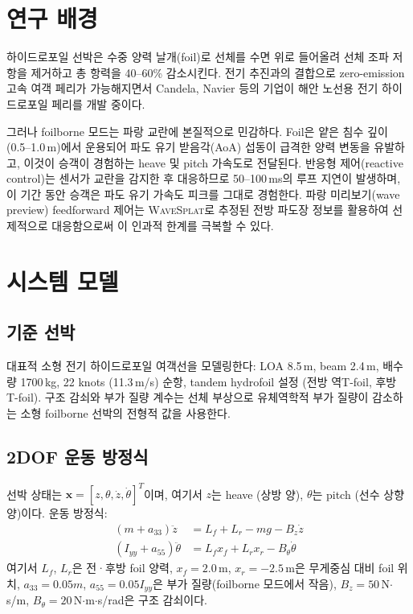 \documentclass[11pt]{report}
\numberwithin{equation}{chapter}
\numberwithin{figure}{chapter}
\numberwithin{table}{chapter}
\newcommand{\WS}{\textsc{WaveSplat}}
\begin{document}
\section{연구 배경}
\label{sec:hydrofoil_bg}

하이드로포일 선박은 수중 양력 날개(foil)로 선체를 수면 위로 들어올려
선체 조파 저항을 제거하고 총 항력을 40--60\% 감소시킨다.
전기 추진과의 결합으로 zero-emission 고속 여객 페리가 가능해지면서
Candela, Navier 등의 기업이 해안 노선용 전기 하이드로포일 페리를 개발 중이다.

그러나 foilborne 모드는 파랑 교란에 본질적으로 민감하다.
Foil은 얕은 침수 깊이(0.5--1.0\,m)에서 운용되어 파도 유기 받음각(AoA) 섭동이
급격한 양력 변동을 유발하고, 이것이 승객이 경험하는 heave 및 pitch 가속도로
전달된다.
반응형 제어(reactive control)는 센서가 교란을 감지한 후 대응하므로
50--100\,ms의 루프 지연이 발생하며, 이 기간 동안 승객은 파도 유기 가속도 피크를
그대로 경험한다.
파랑 미리보기(wave preview) feedforward 제어는
\WS{}로 추정된 전방 파도장 정보를 활용하여 선제적으로 대응함으로써
이 인과적 한계를 극복할 수 있다.

\section{시스템 모델}
\label{sec:hydrofoil_model}

\subsection{기준 선박}

대표적 소형 전기 하이드로포일 여객선을 모델링한다:
LOA 8.5\,m, beam 2.4\,m, 배수량 1700\,kg,
22 knots (11.3\,m/s) 순항, tandem hydrofoil 설정
(전방 역T-foil, 후방 T-foil).
구조 감쇠와 부가 질량 계수는 선체 부상으로 유체역학적 부가 질량이 감소하는
소형 foilborne 선박의 전형적 값을 사용한다.

\subsection{2DOF 운동 방정식}

선박 상태는 $\mathbf{x} = [z, \theta, \dot{z}, \dot{\theta}]^T$이며,
여기서 $z$는 heave (상방 양), $\theta$는 pitch (선수 상향 양)이다.
운동 방정식:
\begin{align}
  (m + a_{33})\ddot{z} &= L_f + L_r - mg - B_z \dot{z}
  \label{eq:heave} \\
  (I_{yy} + a_{55})\ddot{\theta} &= L_f x_f + L_r x_r - B_\theta \dot{\theta}
  \label{eq:pitch}
\end{align}
여기서 $L_f$, $L_r$은 전·후방 foil 양력,
$x_f = 2.0$\,m, $x_r = -2.5$\,m은 무게중심 대비 foil 위치,
$a_{33} = 0.05m$, $a_{55} = 0.05 I_{yy}$은 부가 질량(foilborne 모드에서 작음),
$B_z = 50$\,N$\cdot$s/m, $B_\theta = 20$\,N$\cdot$m$\cdot$s/rad은 구조 감쇠이다.
\end{document}
